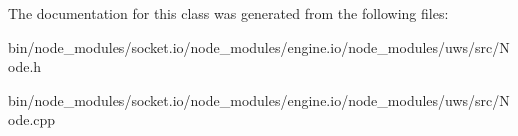 The documentation for this class was generated from the following files\+:\begin{DoxyCompactItemize}
\item 
bin/node\+\_\+modules/socket.\+io/node\+\_\+modules/engine.\+io/node\+\_\+modules/uws/src/Node.\+h\item 
bin/node\+\_\+modules/socket.\+io/node\+\_\+modules/engine.\+io/node\+\_\+modules/uws/src/Node.\+cpp\end{DoxyCompactItemize}
